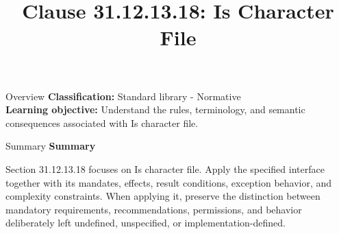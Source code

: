 \documentclass[10pt,letterpaper]{article}
\title{Clause 31.12.13.18: Is Character File}
\author{}
\date{}
\begin{document}
\maketitle
\begin{CornellOverviewBox}{Overview}
\textbf{Classification:} Standard library - Normative\\[2pt]
\textbf{Learning objective:} Understand the rules, terminology, and semantic consequences associated with Is character file.
\end{CornellOverviewBox}\begin{CornellSummaryBox}{Summary}
{\sffamily\bfseries\color{Accent} Summary}\par\vspace{3pt}Section 31.12.13.18 focuses on Is character file. Apply the specified interface together with its mandates, effects, result conditions, exception behavior, and complexity constraints. When applying it, preserve the distinction between mandatory requirements, recommendations, permissions, and behavior deliberately left undefined, unspecified, or implementation-defined.
\end{CornellSummaryBox}
\end{document}
